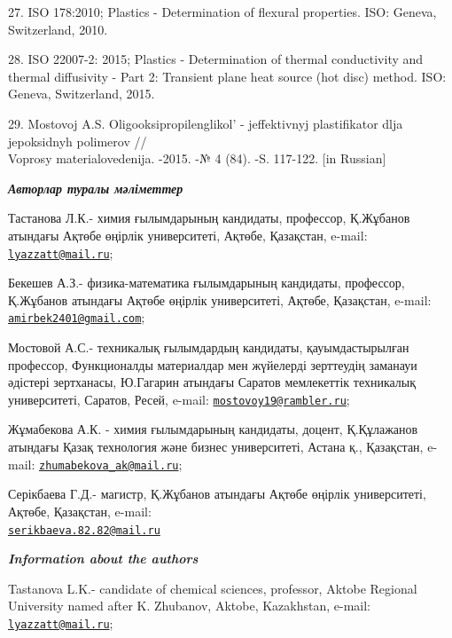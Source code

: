 \begin{references}
27. ISO 178:2010; Plastics - Determination of flexural properties. ISO:
Geneva, Switzerland, 2010.

28. ISO 22007-2: 2015; Plastics - Determination of thermal conductivity
and thermal diffusivity - Part 2: Transient plane heat source (hot
disc) method. ISO: Geneva, Switzerland, 2015.

29. Mostovoj A.S. Oligooksipropilenglikol'{} - jeffektivnyj
plastifikator dlja jepoksidnyh polimerov // \\Voprosy materialovedenija.
-2015. -№ 4 (84). -S. 117-122. {[}in Russian{]}
\end{references}

\begin{authorinfo}
\hspace{1em}\emph{{\bfseries Авторлар туралы мәліметтер}}

Тастанова Л.К.- химия ғылымдарының кандидаты, профессор, Қ.Жұбанов
атындағы Ақтөбе өңірлік университеті, Ақтөбе, Қазақстан, e-mail:
\href{mailto:lyazzatt@mail.ru}{\nolinkurl{lyazzatt@mail.ru}};

Бекешев А.З.- физика-математика ғылымдарының кандидаты, профессор,
Қ.Жұбанов атындағы Ақтөбе өңірлік университеті, Ақтөбе, Қазақстан,
e-mail:
\href{mailto:amirbek2401@gmail.com}{\nolinkurl{amirbek2401@gmail.com}};

Мостовой А.С.- техникалық ғылымдардың кандидаты, қауымдастырылған
профессор, Функционалды материалдар мен жүйелерді зерттеудің заманауи
әдістері зертханасы, Ю.Гагарин атындағы Саратов мемлекеттік техникалық
университеті, Саратов, Ресей, e-mail:
\href{mailto:mostovoy19@rambler.ru}{\nolinkurl{mostovoy19@rambler.ru}};

Жұмабекова А.К. - химия ғылымдарының кандидаты, доцент, Қ.Құлажанов
атындағы Қазақ технология және бизнес университеті, Астана қ.,
Қазақстан, e-mail:
\href{mailto:zhumabekova_ak@mail.ru}{\nolinkurl{zhumabekova\_ak@mail.ru}};

Серікбаева Г.Д.- магистр, Қ.Жұбанов атындағы Ақтөбе өңірлік
университеті, Ақтөбе, Қазақстан, e-mail:
\\\href{mailto:serikbaeva.82.82@mail.ru}{\nolinkurl{serikbaeva.82.82@mail.ru}}

\hspace{1em}\emph{{\bfseries Information about the authors}}

Tastanova L.K.- candidate of chemical sciences, professor, Aktobe
Regional University named after K. Zhubanov, Aktobe, Kazakhstan, e-mail:
\href{mailto:lyazzatt@mail.ru}{\nolinkurl{lyazzatt@mail.ru}};


\end{authorinfo}
